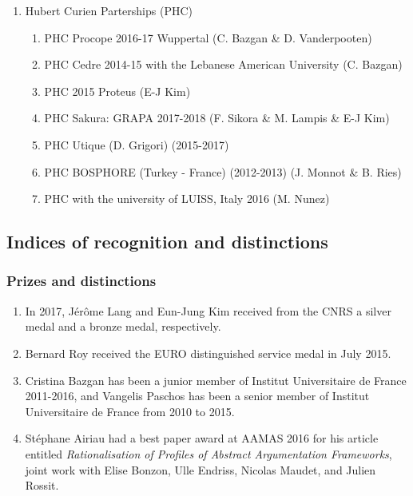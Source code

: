 \documentclass[version=last, pagesize, twoside=semi, DIV=calc, 12pt, a4paper, french, english, bibliography=totoc]{scrartcl}
\begin{document}
\begin{enumerate}
\item Hubert Curien Parterships (PHC)
\begin{enumerate}
\item PHC Procope 2016-17 Wuppertal (C. Bazgan \& D. Vanderpooten)
\item PHC Cedre  2014-15 with the Lebanese American University (C. Bazgan) 
\item PHC 2015 Proteus (E-J Kim)
\item PHC Sakura: GRAPA  2017-2018 (F. Sikora \& M. Lampis \&  E-J Kim)
\item PHC Utique (D. Grigori) (2015-2017) %
\item PHC BOSPHORE (Turkey - France) (2012-2013) (J. Monnot \& B. Ries)  
\item PHC with the university of LUISS,  Italy 2016 (M. Nunez)
\end{enumerate}
\end{enumerate}






\subsection{Indices of recognition and distinctions}

\subsubsection{Prizes and distinctions}
\begin{enumerate}
\item
In 2017, J\'er\^ome Lang and Eun-Jung Kim  received from the CNRS a silver medal and a bronze medal, respectively. 
\item

Bernard Roy received the EURO distinguished service medal in July 2015. 
\item 

Cristina  Bazgan has been a junior  member of Institut Universitaire de France 2011-2016, and Vangelis Paschos has been a senior  member of Institut Universitaire de France from 2010 to 2015. 

\item
St\'ephane Airiau had a best paper award at AAMAS 2016 for his article entitled {\em Rationalisation of Profiles of Abstract Argumentation Frameworks}, joint work with Elise Bonzon, Ulle Endriss, Nicolas Maudet, and Julien Rossit.
\end{enumerate}
\end{document}
